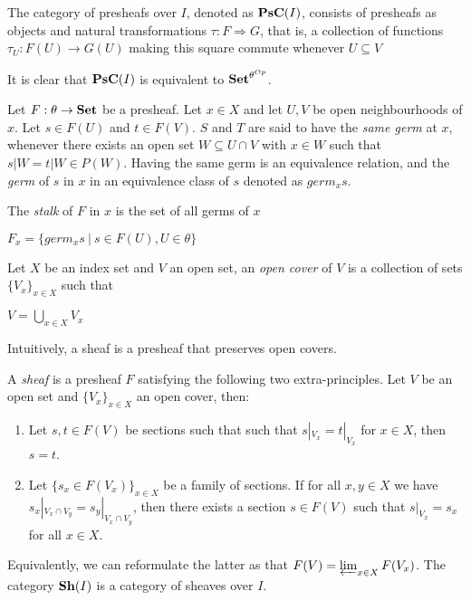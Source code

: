\documentclass[a4paper]{article}
\theoremstyle{defin}
\theoremstyle{theorem}
\theoremstyle{claim}
\theoremstyle{prop}
\theoremstyle{lemma}
\theoremstyle{fact}
\theoremstyle{ex}
\theoremstyle{col}
\begin{document}
The category of presheafs over $I$, denoted as ${\bf PsC}(I)$, consists of presheafs as objects and natural transformations $\tau : F \Rightarrow G$, that is, a collection of functions $\tau_U : F(U) \to G(U)$ making this square commute whenever $U \subseteq V$


It is clear that ${\bf PsC}(I)$ is equivalent to ${\bf Set}^{\theta^{Op}}$.

Let $F : \theta \to {\bf Set}$ be a presheaf. Let $x \in X$ and let $U, V$ be open neighbourhoods of $x$.
Let $s \in F(U)$ and $t \in F(V)$. $S$ and $T$ are said to have the \emph{same germ} at $x$, whenever there exists an open set $W \subseteq U \cap V$ with $x \in W$ such that $s|W = t|W \in P(W)$. Having the same germ is an equivalence relation, and the \emph{germ} of $s$ in $x$ in an equivalence class of $s$ denoted as $germ_x s$.

The \emph{stalk} of $F$ in $x$ is the set of all germs of $x$
\begin{center}
$F_x = \{ germ_x s \: | \: s \in F(U), U \in \theta \}$
\end{center}

Let $X$ be an index set and $V$ an open set, an \emph{open cover} of $V$ is a collection of sets $\{ V_x\}_{x \in X}$ such that
\begin{center}
$V = \bigcup \limits_{x \in X} V_x$
\end{center}

Intuitively, a sheaf is a presheaf that preserves open covers.

A \emph{sheaf} is a presheaf $F$ satisfying the following two extra-principles. Let $V$ be an open set and $\{V_x
\}_{x \in X}$ an open cover, then:
\begin{enumerate}
\item Let $s, t \in F(V)$ be sections such that such that $s|_{V_x} = t|_{V_x}$ for $x \in X$, then $s = t$.
\item Let $\{ s_x \in F(V_x) \}_{x \in X}$ be a family of sections. If for all $x, y \in X$ we have $s_x|_{V_x \cap V_y} = s_y|_{V_x \cap V_y}$, then there exists a section $s \in F(V)$ such that $s|_{V_x} = s_x$ for all $x \in X$.
\end{enumerate}
Equivalently, we can reformulate the latter as that $F(V) = \varprojlim_{x \in X} F(V_x)$.
The category ${\bf Sh}(I)$ is a category of sheaves over $I$.
\end{document}
